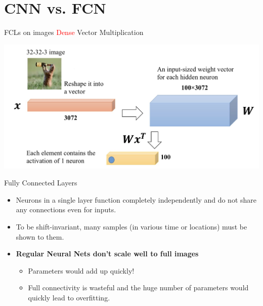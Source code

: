 \documentclass[serif, aspectratio=169]{beamer}
\begin{document}
	
	
	\section{CNN vs. FCN}
	\begin{frame}{FCLs on images}
		\textcolor{red}{Dense} Vector Multiplication
		\begin{center}
			\includegraphics[keepaspectratio, scale=0.2]{pic/Processing images.jpg}
		\end{center}
	\end{frame}
	\begin{frame}{Fully Connected Layers}
		\begin{itemize}
			\item Neurons in a single layer function completely independently and do not share any connections even for inputs.
			
			\bigskip
			
			\item To be shift-invariant, many samples (in various time or locations) must be shown to them.
			
			\bigskip
			
			\item \textbf{Regular Neural Nets don’t scale well to full images}
			\begin{itemize}
				\item Parameters would add up quickly!
				\item Full connectivity is wasteful and the huge number of parameters would quickly lead to overfitting.
			\end{itemize}
		\end{itemize}
	\end{frame}
\end{document}
